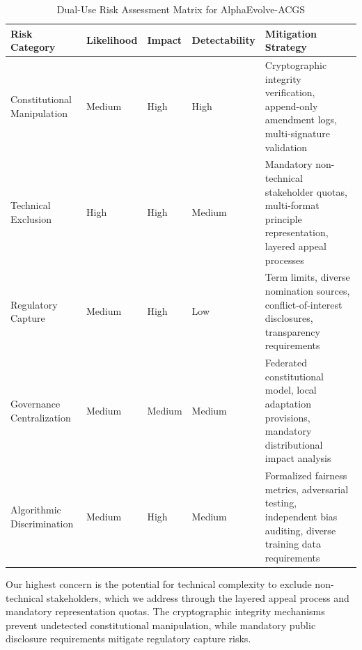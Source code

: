 \documentclass[manuscript,screen,review,anonymous,9pt]{acmart}
\newcommand{\tablesize}{\tiny}
\newcommand{\tableheader}[1]{\textbf{#1}}
\begin{document}
\begin{table}[htbp]
    \centering
    \caption{Dual-Use Risk Assessment Matrix for AlphaEvolve-ACGS}
    \label{tab:risk_assessment}
    \tablesize
    \begin{tabular}{@{}p{2.5cm}p{1.3cm}p{1.3cm}p{1.3cm}p{3.7cm}@{}}
        \toprule
        \tableheader{Risk Category} & \tableheader{Likelihood} & \tableheader{Impact} & \tableheader{Detectability} & \tableheader{Mitigation Strategy} \\
        \midrule
        Constitutional Manipulation & Medium & High & High & Cryptographic integrity verification, append-only amendment logs, multi-signature validation \\
        \midrule
        Technical Exclusion & High & High & Medium & Mandatory non-technical stakeholder quotas, multi-format principle representation, layered appeal processes \\
        \midrule
        Regulatory Capture & Medium & High & Low & Term limits, diverse nomination sources, conflict-of-interest disclosures, transparency requirements \\
        \midrule
        Governance Centralization & Medium & Medium & Medium & Federated constitutional model, local adaptation provisions, mandatory distributional impact analysis \\
        \midrule
        Algorithmic Discrimination & Medium & High & Medium & Formalized fairness metrics, adversarial testing, independent bias auditing, diverse training data requirements \\
        \bottomrule
    \end{tabular}
\end{table}

Our highest concern is the potential for technical complexity to exclude non-technical stakeholders, which we address through the layered appeal process and mandatory representation quotas. The cryptographic integrity mechanisms prevent undetected constitutional manipulation, while mandatory public disclosure requirements mitigate regulatory capture risks.
\end{document}
